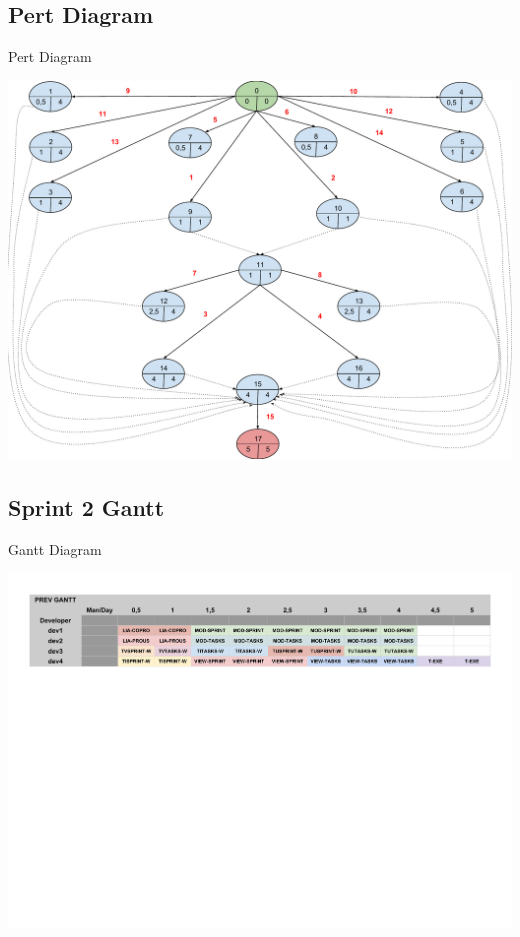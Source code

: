 \documentclass{beamer}
\begin{document}
\subsection{Pert Diagram}

\begin{frame}{Pert Diagram}
	\begin{center}
       \includegraphics[scale=0.32]{Pert2.pdf}
        \end{center}
\end{frame}


\subsection{Sprint 2 Gantt}

\begin{frame}{Gantt Diagram}
	\begin{center}
        \includegraphics[scale=0.412]{Gantt2.pdf}
        \end{center}
\end{frame}
\end{document}
